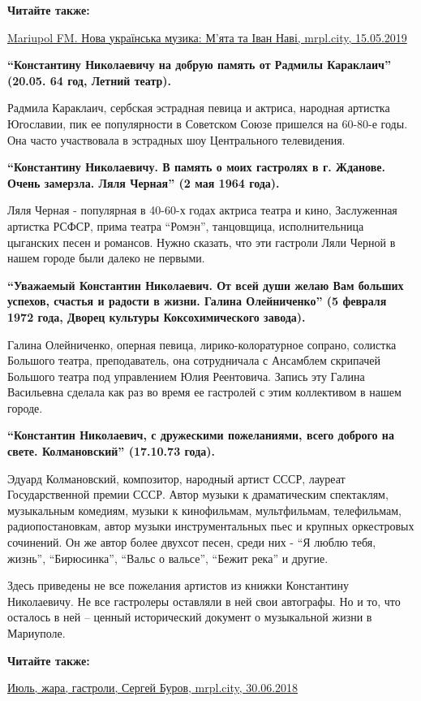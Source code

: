 \textbf{Читайте также:} 

\href{https://mrpl.city/blogs/view/mariupol-fm-nova-ukrainska-muzika-myata-ta-ivan-navi}{%
Mariupol FM. Нова українська музика: М'ята та Іван Наві, mrpl.city, 15.05.2019}

\textbf{\enquote{Константину Николаевичу на добрую память от Радмилы Караклаич} (20.05. 64 год, Летний театр).} 

Радмила Караклаич, сербская эстрадная певица и актриса, народная артистка
Югославии, пик ее популярности в Советском Союзе пришелся на 60-80-е годы. Она
часто участвовала в эстрадных шоу Центрального телевидения.

\textbf{\enquote{Константину Николаевичу. В память о моих гастролях в г. Жданове. Очень замерзла. Ляля Черная} (2 мая 1964 года).}

Ляля Черная - популярная в 40-60-х годах актриса театра и кино, Заслуженная
артистка РСФСР, прима театра \enquote{Ромэн}, танцовщица, исполнительница цыганских
песен и романсов. Нужно сказать, что эти гастроли Ляли Черной в нашем городе
были далеко не первыми.

\textbf{\enquote{Уважаемый Константин Николаевич. От всей души желаю Вам больших успехов,
счастья и радости в жизни. Галина Олейниченко} (5 февраля 1972 года, Дворец
культуры Коксохимического завода).}

Галина Олейниченко, оперная певица, лирико-колоратурное сопрано, солистка
Большого театра, преподаватель, она сотрудничала с Ансамблем скрипачей Большого
театра под управлением Юлия Реентовича. Запись эту Галина Васильевна сделала
как раз во время ее гастролей с этим коллективом в нашем городе.

\textbf{\enquote{Константин Николаевич, с дружескими пожеланиями, всего доброго на свете. Колмановский} (17.10.73 года).}

Эдуард Колмановский, композитор, народный артист СССР, лауреат Государственной
премии СССР.  Автор музыки к драматическим спектаклям, музыкальным комедиям,
музыки к кинофильмам, мультфильмам, телефильмам, радиопостановкам, автор музыки
инструментальных пьес и крупных оркестровых сочинений. Он же автор более
двухсот песен, среди них - \enquote{Я люблю тебя, жизнь}, \enquote{Бирюсинка}, \enquote{Вальс о
вальсе}, \enquote{Бежит река} и другие.

Здесь приведены не все пожелания артистов из книжки Константину Николаевичу. Не
все гастролеры оставляли в ней свои автографы. Но и то, что осталось в ней –
ценный исторический документ о музыкальной жизни в Мариуполе.

\textbf{Читайте также:} 

\href{https://archive.org/details/30_06_2018.sergij_burov.mrpl_city.ijul_zhara_gastroli}{%
Июль, жара, гастроли, Сергей Буров, mrpl.city, 30.06.2018}
